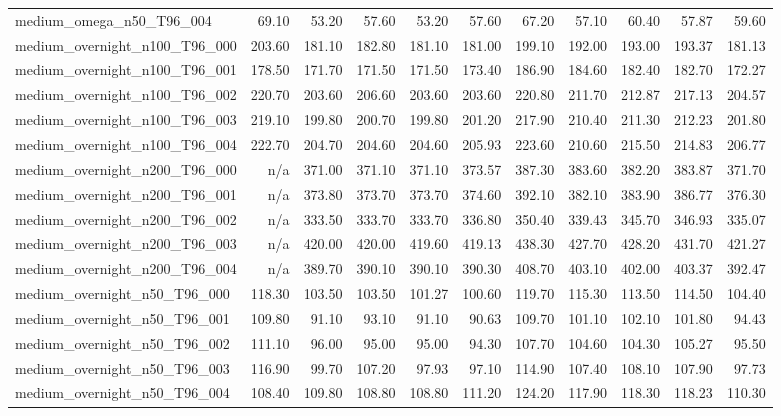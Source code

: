 \begin{table}[htbp]
\begin{tabular}{lrrrrrrrrrr}
medium\_omega\_n50\_T96\_004 & 69.10 & 53.20 & 57.60 & 53.20 & 57.60 & 67.20 & 57.10 & 60.40 & 57.87 & 59.60 \\
medium\_overnight\_n100\_T96\_000 & 203.60 & 181.10 & 182.80 & 181.10 & 181.00 & 199.10 & 192.00 & 193.00 & 193.37 & 181.13 \\
medium\_overnight\_n100\_T96\_001 & 178.50 & 171.70 & 171.50 & 171.50 & 173.40 & 186.90 & 184.60 & 182.40 & 182.70 & 172.27 \\
medium\_overnight\_n100\_T96\_002 & 220.70 & 203.60 & 206.60 & 203.60 & 203.60 & 220.80 & 211.70 & 212.87 & 217.13 & 204.57 \\
medium\_overnight\_n100\_T96\_003 & 219.10 & 199.80 & 200.70 & 199.80 & 201.20 & 217.90 & 210.40 & 211.30 & 212.23 & 201.80 \\
medium\_overnight\_n100\_T96\_004 & 222.70 & 204.70 & 204.60 & 204.60 & 205.93 & 223.60 & 210.60 & 215.50 & 214.83 & 206.77 \\
medium\_overnight\_n200\_T96\_000 & n/a & 371.00 & 371.10 & 371.10 & 373.57 & 387.30 & 383.60 & 382.20 & 383.87 & 371.70 \\
medium\_overnight\_n200\_T96\_001 & n/a & 373.80 & 373.70 & 373.70 & 374.60 & 392.10 & 382.10 & 383.90 & 386.77 & 376.30 \\
medium\_overnight\_n200\_T96\_002 & n/a & 333.50 & 333.70 & 333.70 & 336.80 & 350.40 & 339.43 & 345.70 & 346.93 & 335.07 \\
medium\_overnight\_n200\_T96\_003 & n/a & 420.00 & 420.00 & 419.60 & 419.13 & 438.30 & 427.70 & 428.20 & 431.70 & 421.27 \\
medium\_overnight\_n200\_T96\_004 & n/a & 389.70 & 390.10 & 390.10 & 390.30 & 408.70 & 403.10 & 402.00 & 403.37 & 392.47 \\
medium\_overnight\_n50\_T96\_000 & 118.30 & 103.50 & 103.50 & 101.27 & 100.60 & 119.70 & 115.30 & 113.50 & 114.50 & 104.40 \\
medium\_overnight\_n50\_T96\_001 & 109.80 & 91.10 & 93.10 & 91.10 & 90.63 & 109.70 & 101.10 & 102.10 & 101.80 & 94.43 \\
medium\_overnight\_n50\_T96\_002 & 111.10 & 96.00 & 95.00 & 95.00 & 94.30 & 107.70 & 104.60 & 104.30 & 105.27 & 95.50 \\
medium\_overnight\_n50\_T96\_003 & 116.90 & 99.70 & 107.20 & 97.93 & 97.10 & 114.90 & 107.40 & 108.10 & 107.90 & 97.73 \\
medium\_overnight\_n50\_T96\_004 & 108.40 & 109.80 & 108.80 & 108.80 & 111.20 & 124.20 & 117.90 & 118.30 & 118.23 & 110.30 \\

\end{tabular}
\end{table}
